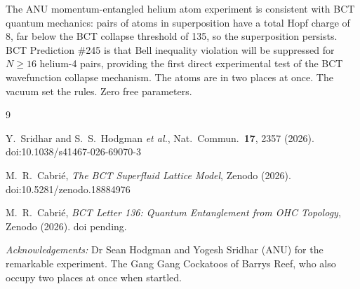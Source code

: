\documentclass[aps,prl,twocolumn,showpacs,superscriptaddress]{revtex4-2}
\begin{document}
The ANU momentum-entangled helium atom experiment is consistent with
BCT quantum mechanics: pairs of atoms in superposition have a total
Hopf charge of 8, far below the BCT collapse threshold of 135,
so the superposition persists. BCT Prediction \#245 is that Bell
inequality violation will be suppressed for $N \geq 16$ helium-4
pairs, providing the first direct experimental test of the BCT
wavefunction collapse mechanism. The atoms are in two places at once.
The vacuum set the rules. Zero free parameters.

\begin{thebibliography}{9}

Y.~Sridhar and S.~S.~Hodgman \textit{et al.},
Nat.\ Commun.\ \textbf{17}, 2357 (2026).
doi:10.1038/s41467-026-69070-3

M.~R.~Cabri\'{e},
\textit{The BCT Superfluid Lattice Model},
Zenodo (2026). doi:10.5281/zenodo.18884976

M.~R.~Cabri\'{e},
\textit{BCT Letter 136: Quantum Entanglement from OHC Topology},
Zenodo (2026). doi pending.

\end{thebibliography}

\vspace{6pt}
\noindent\textit{Acknowledgements:} Dr Sean Hodgman and Yogesh Sridhar
(ANU) for the remarkable experiment. The Gang Gang Cockatoos of
Barrys Reef, who also occupy two places at once when startled.
\end{document}
